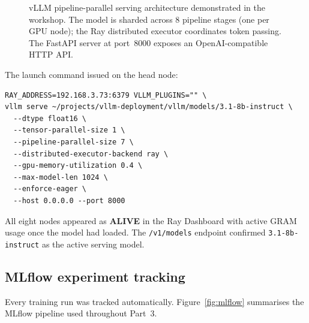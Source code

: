 \documentclass[12pt,a4paper]{article}
\begin{document}
\begin{figure}[H]
\begin{mdframed}[style=slidebox]
\begin{center}
\end{center}
\end{mdframed}
\caption{vLLM pipeline-parallel serving architecture demonstrated in the workshop.
  The model is sharded across 8 pipeline stages (one per GPU node); the Ray distributed
  executor coordinates token passing. The FastAPI server at port~8000 exposes an
  OpenAI-compatible HTTP API.}
\label{fig:vllmpipeline}
\end{figure}

The launch command issued on the head node:

\begin{lstlisting}[style=terminal, caption={vLLM multi-node launch command.}]
RAY_ADDRESS=192.168.3.73:6379 VLLM_PLUGINS="" \
vllm serve ~/projects/vllm-deployment/vllm/models/3.1-8b-instruct \
  --dtype float16 \
  --tensor-parallel-size 1 \
  --pipeline-parallel-size 7 \
  --distributed-executor-backend ray \
  --gpu-memory-utilization 0.4 \
  --max-model-len 1024 \
  --enforce-eager \
  --host 0.0.0.0 --port 8000
\end{lstlisting}

All eight nodes appeared as \textbf{ALIVE} in the Ray Dashboard with
active GRAM usage once the model had loaded. The \texttt{/v1/models}
endpoint confirmed \texttt{3.1-8b-instruct} as the active serving model.

\subsection{MLflow experiment tracking}

Every training run was tracked automatically. Figure~\ref{fig:mlflow}
summarises the MLflow pipeline used throughout Part~3.
\end{document}
